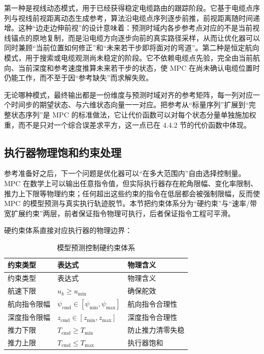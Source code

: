 第一种是视线动态模式，用于已经获得稳定电缆路由的跟踪阶段。它基于电缆点序列与视线前视距离动态生成参考，算法沿电缆点序列逐步前推，前视距离随时间递增。这种``边走边伸前视''的设计意味着：预测时域内各步参考点对应的不是当前视线锚点的原地复制，而是沿电缆方向逐步向前的真实路径采样，从而让优化器可以同时兼顾``当前位置如何修正''和``未来若干步即将面对的弯道''。第二种是恒定航向模式，用于搜索或电缆观测尚未稳定的阶段。它不依赖电缆点先验，完全由当前航向、当前深度和参考速度推算未来若干步的状态，使 MPC 在尚未确认电缆位置时仍能工作，而不至于因``参考缺失''而求解失败。

无论哪种模式，最终输出都是一份维度与预测时域对齐的参考矩阵，每一列对应一个时间步的期望状态、与六维状态向量一一对应。把参考从``标量序列''扩展到``完整状态序列''是 MPC 的标准做法，它让代价函数可以对每个状态分量单独施加权重，而不是只对一个综合误差求平方，这一点已在 4.4.2 节的代价函数中体现。

\subsection{执行器物理饱和约束处理}\label{sec:ch04-4-4-5}

参考准备好之后，下一个问题是优化器可以``在多大范围内''自由选择控制量。MPC 在数学上可以输出任意指令值，但实际执行器存在舵角限幅、变化率限制、推力上下限等物理约束；任何超出这些约束的指令在低层都会被强制限幅，反而使 MPC 的模型预测与真实执行轨迹脱节。本节把约束体系分为``硬约束''与``速率/带宽扩展约束''两层，前者保证指令物理可执行，后者保证指令工程可平滑。

硬约束体系直接对应执行器的物理边界：

\begin{longtable}[]{@{}lll@{}}
\caption{模型预测控制硬约束体系}\label{tab:ch04-hard-constraints}\tabularnewline
\toprule\noalign{}
约束类型 & 表达式 & 物理含义 \\
\midrule\noalign{}
\endfirsthead
\toprule\noalign{}
约束类型 & 表达式 & 物理含义 \\
\midrule\noalign{}
\endhead
\bottomrule\noalign{}
\endlastfoot
航速下限 & \(u_k\ge u_{\min}\) & 确保舵效 \\
航向指令限幅 & \(\psi_{\mathrm{cmd}}\in[\psi_{\min},\psi_{\max}]\) & 航向指令合理性 \\
深度指令限幅 & \(z_{\mathrm{cmd}}\in[z_{\min},z_{\max}]\) & 深度指令合理性 \\
推力下限 & \(T_{\mathrm{cmd}}\ge T_{\min}\) & 防止推力清零失稳 \\
推力上限 & \(T_{\mathrm{cmd}}\le T_{\max}\) & 执行器饱和 \\
\end{longtable}

